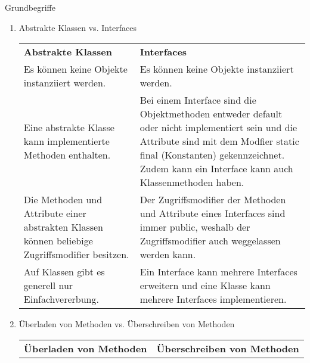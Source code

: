 \documentclass{../preamble}
\begin{document}
\begin{task}[credit = \stars{0}{3}]{Grundbegriffe}
\begin{solution}
\begin{enumerate}
            \item Abstrakte Klassen vs. Interfaces
                  \begin{table}[h]
                      \centering
                      \begin{tabular}{p{22.5em}p{22.5em}}
                          \textbf{Abstrakte Klassen}                                                                      & \textbf{Interfaces}
                          \\
                          Es können keine Objekte instanziiert werden.                                                    & Es können keine Objekte instanziiert werden.
                          \\
                          Eine abstrakte Klasse kann implementierte Methoden enthalten.                                   & Bei einem Interface sind die Objektmethoden entweder \textcolor{keywordcolor}{default} oder nicht implementiert sein und die Attribute sind mit dem Modfier \textcolor{keywordcolor}{static final} (Konstanten) gekennzeichnet. Zudem kann ein Interface kann auch Klassenmethoden haben.
                          \\
                          Die Methoden und Attribute einer abstrakten Klassen können beliebige Zugriffsmodifier besitzen. & Der Zugriffsmodifier der Methoden und Attribute eines Interfaces sind immer \textcolor{keywordcolor}{public}, weshalb der Zugriffsmodifier auch weggelassen werden kann.
                          \\
                          Auf Klassen gibt es generell nur Einfachvererbung.                                              & Ein Interface kann mehrere Interfaces erweitern und eine Klasse kann mehrere Interfaces implementieren.
                          \\
                      \end{tabular}
                  \end{table}
            \item Überladen von Methoden vs. Überschreiben von Methoden
                  \begin{table}[H]
                      \centering
                      \begin{tabular}{p{22.5em}p{22.5em}}
                          \textbf{Überladen von Methoden}                                                                                                                                                                                                                                                                                                                                                                                                                                                                                       & \textbf{Überschreiben von Methoden}

\end{tabular}
\end{table}
\end{enumerate}
\end{solution}
\end{task}
\end{document}
